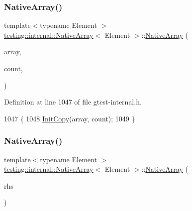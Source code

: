 \subsubsection{\texorpdfstring{Native\+Array()}{NativeArray()}\hspace{0.1cm}{\footnotesize\ttfamily [2/3]}}
{\footnotesize\ttfamily template$<$typename Element $>$ \\
\hyperlink{classtesting_1_1internal_1_1NativeArray}{testing\+::internal\+::\+Native\+Array}$<$ Element $>$\+::\hyperlink{classtesting_1_1internal_1_1NativeArray}{Native\+Array} (\begin{DoxyParamCaption}\item[{const Element $\ast$}]{array,  }\item[{size\+\_\+t}]{count,  }\item[{\hyperlink{structtesting_1_1internal_1_1RelationToSourceCopy}{Relation\+To\+Source\+Copy}}]{ }\end{DoxyParamCaption})\hspace{0.3cm}{\ttfamily [inline]}}



Definition at line 1047 of file gtest-\/internal.\+h.


\begin{DoxyCode}
1047                                                                         \{
1048     \hyperlink{classtesting_1_1internal_1_1NativeArray_a8c0069cc09f559785fe4923fc118056f}{InitCopy}(array, count);
1049   \}
\end{DoxyCode}
\mbox{\label{classtesting_1_1internal_1_1NativeArray_abb346ac3040f5da733f594cc2d5958bc}} 
\subsubsection{\texorpdfstring{Native\+Array()}{NativeArray()}\hspace{0.1cm}{\footnotesize\ttfamily [3/3]}}
{\footnotesize\ttfamily template$<$typename Element $>$ \\
\hyperlink{classtesting_1_1internal_1_1NativeArray}{testing\+::internal\+::\+Native\+Array}$<$ Element $>$\+::\hyperlink{classtesting_1_1internal_1_1NativeArray}{Native\+Array} (\begin{DoxyParamCaption}\item[{const \hyperlink{classtesting_1_1internal_1_1NativeArray}{Native\+Array}$<$ Element $>$ \&}]{rhs }\end{DoxyParamCaption})\hspace{0.3cm}{\ttfamily [inline]}}



